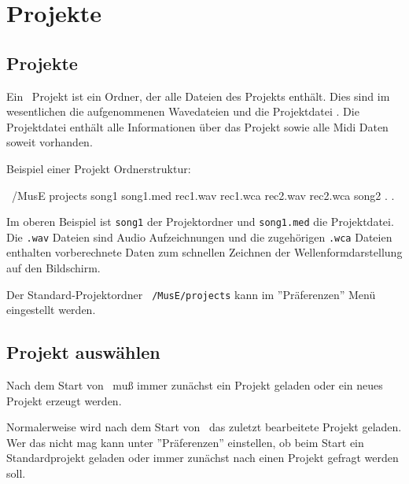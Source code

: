\chapter{Projekte}

  \section{Projekte}

      Ein \M\ Projekt  ist ein Ordner, der alle 
      Dateien des Projekts enthält. Dies sind im wesentlichen die 
      aufgenommenen Wavedateien und die Projektdatei .
      Die Projektdatei enthält alle
      Informationen über das Projekt sowie alle Midi Daten soweit
      vorhanden.

      Beispiel einer Projekt Ordnerstruktur:

      \starttyping
      ~/MusE
            projects
                  song1             
                        song1.med
                        rec1.wav
                        rec1.wca
                        rec2.wav
                        rec2.wca
                  song2
                          .             
                          .             
      \stoptyping

      Im oberen Beispiel ist {\tt song1} der Projektordner
       und
      {\tt song1.med} die Projektdatei. Die {\tt *.wav} Dateien sind
      Audio Aufzeichnungen und die zugehörigen {\tt *.wca} Dateien 
      enthalten vorberechnete Daten zum schnellen Zeichnen der 
      Wellenformdarstellung auf den Bildschirm.

      Der Standard-Projektordner 
      {\tt ~/MusE/projects} kann im ''Präferenzen'' Menü eingestellt 
      werden.

   \section{Projekt auswählen}

      Nach dem Start von \M\ muß immer zunächst ein Projekt geladen oder
      ein neues Projekt erzeugt werden.

      Normalerweise wird nach dem Start von \M\ das zuletzt bearbeitete
      Projekt geladen. Wer das nicht mag kann unter ''Präferenzen'' 
      einstellen, ob beim Start ein Standardprojekt 
      geladen oder immer zunächst nach einen Projekt gefragt werden soll.

